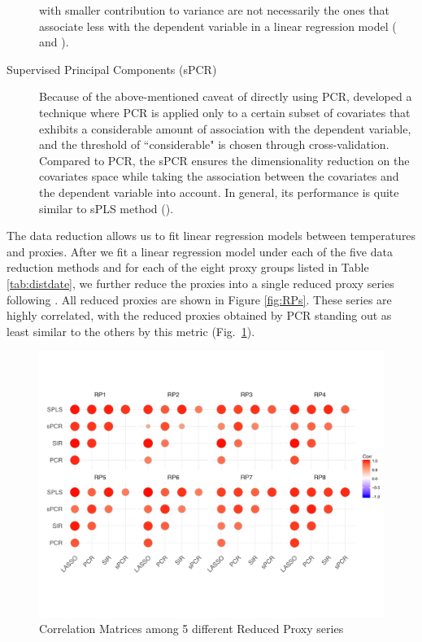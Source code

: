\documentclass[11pt]{amsart}
\theoremstyle{plain}
\theoremstyle{definition}
\theoremstyle{remark}
\begin{document}
\begin{description}
with smaller contribution to variance are not necessarily the ones that
associate less with the dependent variable in a linear regression model (
\cite{Jolliffe1982} and \cite{Tibshirani1996}). 
\item[Supervised Principal Components (sPCR)]
Because of the above-mentioned caveat of directly using PCR, \cite{Bair2006} developed a technique where PCR is applied only
to a certain subset of covariates that exhibits a considerable amount of association
 with the dependent variable, and the threshold of ``considerable" is chosen through
cross-validation. Compared to PCR, the sPCR ensures the dimensionality
reduction on the covariates space while taking the association between
the covariates and the dependent variable into account. In general, its performance is quite similar to
sPLS method (\cite{Chung2013}).  
\end{description}

The data reduction allows us to fit linear regression models between temperatures and proxies. After we fit a linear regression model under each of the five data reduction methods and for each of the eight proxy groups listed in Table \ref{tab:distdate}, we further reduce the proxies into a single reduced proxy series following \cite{Barboza2014}. All reduced proxies are shown in Figure \ref{fig:RPs}.  These series are highly correlated, with the reduced proxies obtained by PCR standing out as least similar to the others by this metric (Fig.~\ref{fig:CorrRPs}).

\begin{figure}[H]
  \centering
 \includegraphics[scale=0.38]{CorMatrixRPs} 
  \caption{Correlation Matrices among 5 different Reduced Proxy series}
  \label{fig:CorrRPs}
\end{figure}
\end{document}
